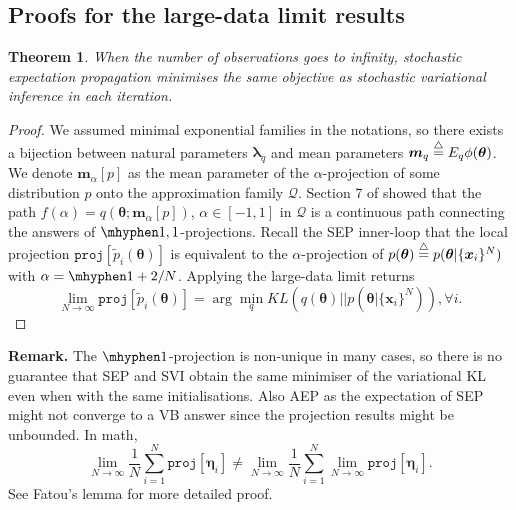 \documentclass{article} %
\newtheorem{theorem}{Theorem}
\begin{document}
\subsection*{Proofs for the large-data limit results}
\begin{theorem}
When the number of observations goes to infinity, stochastic expectation propagation minimises the same objective as stochastic variational inference in each iteration.
\end{theorem}
\begin{proof}
We assumed minimal exponential families in the notations, so there exists a bijection between natural parameters $\bm{\lambda}_q$ and mean parameters $\bm{m}_q \buildrel\triangle\over = E_q \phi(\bm{\theta})$. We denote $\bm{m}_{\alpha}[p]$ as the mean parameter of the $\alpha$-projection of some distribution $p$ onto the approximation family $\mathcal{Q}$. Section 7 of \cite{amari:alpha_proj} showed that the path $f(\alpha) = q(\bm{\theta}; \bm{m}_{\alpha}[p])$, $\alpha \in [-1, 1]$ in $\mathcal{Q}$ is a continuous path connecting the answers of $\mhyphen 1, 1$-projections. Recall the SEP inner-loop that the local projection $\mathtt{proj}[\tilde{p}_i(\bm{\theta})]$ is equivalent to the $\alpha$-projection of $p(\bm{\theta}) \buildrel\triangle\over = p(\bm{\theta} | \{ \bm{x}_i\}^N)$ with $\alpha = \mhyphen 1 + 2/N$. Applying the large-data limit returns
\begin{equation}
\lim_{N \rightarrow \infty} \mathtt{proj}[\tilde{p}_i(\bm{\theta})] = \arg\min_{q} KL(q(\bm{\theta}) || p(\bm{\theta} | \{ \bm{x}_i\}^N)), \forall i.
\end{equation}
\end{proof}

\textbf{Remark.}
The $\mhyphen 1$-projection is non-unique in many cases, so there is no guarantee that SEP and SVI obtain the same minimiser of the variational KL even when with the same initialisations. Also AEP as the expectation of SEP might not converge to a VB answer since the projection results might be unbounded. In math,
\begin{equation}
\lim_{N \rightarrow \infty} \frac{1}{N} \sum_{i=1}^N \mathtt{proj}[\bm{\eta}_i] \neq \lim_{N \rightarrow \infty} \frac{1}{N} \sum_{i=1}^N \lim_{N \rightarrow \infty} \mathtt{proj}[\bm{\eta}_i].
\end{equation}
See Fatou's lemma for more detailed proof.
\end{document}
